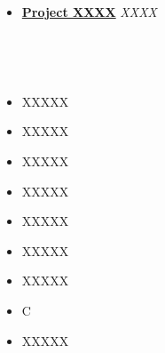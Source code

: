 \documentclass[10pt,A4,english, oneside]{book}
\begin{document}
\begin{paracol}{2}
\begin{rightcolumn}
\begin{itemize}
    \item \href{https://pointerpointer.com}{\textbf{Project XXXX}} 
        \textit{XXXX}\\
        {
            \lipsum[2][1-4]
        }
\end{itemize}


\vspace{4mm}
\heading{\textcolor{kdblue}{Key Skills}}\\
\begin{minipage}[t]{.42\linewidth}
\\





\end{minipage}\hfill
\begin{minipage}[t]{.55\linewidth}
    \begin{itemize}
        \item XXXXX
        \item XXXXX
        \item XXXXX
        \item XXXXX
        \item XXXXX
        \item XXXXX
        \item XXXXX
    \end{itemize}


    \begin{itemize}
        \item C
        \item XXXXX
    \end{itemize}


\end{minipage}
\end{rightcolumn}
\end{paracol}
\end{document}
